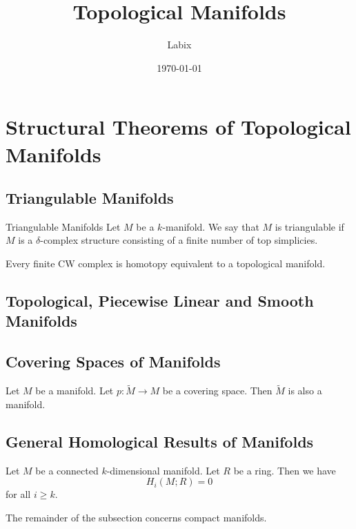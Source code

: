 \documentclass[a4paper]{article}
\title{Topological Manifolds}
\author{Labix}
\date{\today}
\begin{document}
\maketitle
\begin{abstract}
\end{abstract}
\pagebreak
\tableofcontents
\pagebreak

\section{Structural Theorems of Topological Manifolds}
\subsection{Triangulable Manifolds}
\begin{defn}{Triangulable Manifolds}{} Let $M$ be a $k$-manifold. We say that $M$ is triangulable if $M$ is a $\delta$-complex structure consisting of a finite number of top simplicies. 
\end{defn}

\begin{prp}{}{} Every finite CW complex is homotopy equivalent to a topological manifold. 
\end{prp}

\subsection{Topological, Piecewise Linear and Smooth Manifolds}

\subsection{Covering Spaces of Manifolds}
\begin{prp}{}{} Let $M$ be a manifold. Let $p:\widetilde{M}\to M$ be a covering space. Then $\widetilde{M}$ is also a manifold. 
\end{prp}

\subsection{General Homological Results of Manifolds}
\begin{lmm}{}{} Let $M$ be a connected $k$-dimensional manifold. Let $R$ be a ring. Then we have $$H_i(M;R)=0$$ for all $i\geq k$. 
\end{lmm}

The remainder of the subsection concerns compact manifolds. 
\end{document}
